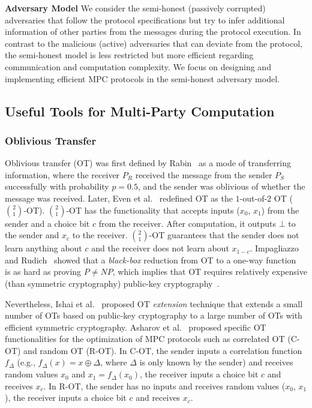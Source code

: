 \textbf{Adversary Model}
We consider the semi-honest (passively corrupted)~\cite[Chapter~2]{evans2017pragmatic} adversaries that follow the protocol specifications but try to infer additional information of other parties from the messages during the protocol execution. In contrast to the malicious (active) adversaries that can deviate from the protocol, the semi-honest model is less restricted but more efficient regarding communication and computation complexity. We focus on designing and implementing efficient MPC protocols in the semi-honest adversary model.

\subsection{Useful Tools for Multi-Party Computation}
\label{subsec:UsefulToolsforMulti-PartyComputation}
\subsubsection{Oblivious Transfer}
\label{subsubsec:OT}
Oblivious transfer (OT) was first defined by Rabin~\cite{rabinOT1981} as a mode of transferring information, where the receiver $P_R$ received the message from the sender $P_S$ successfully with probability $p=0.5$, and the sender was oblivious of whether the message was received.
Later, Even et al.~\cite{even1985} redefined OT as the $1$-out-of-$2$ OT ($\binom{2}{1}$-OT). $\binom{2}{1}$-OT has the functionality that accepts inputs ($x_0$, $x_1$) from the sender and a choice bit $c$ from the receiver. After computation, it outputs $\bot $ to the sender and $x_c$ to the receiver. $\binom{2}{1}$-OT guarantees that the sender does not learn anything about $c$ and the receiver does not learn about $x_{1-c}$.
Impagliazzo and Rudich~\cite{Russel1990} showed that a \textit{black-box} reduction from OT to a one-way function~\cite[Chapter~2]{oded2006foundations} is as hard as proving $P\neq NP$, which implies that OT requires relatively expensive (than symmetric cryptography) public-key cryptography~\cite{rivest1978method}.

Nevertheless, Ishai et al.~\cite{IKNP03} proposed OT \textit{extension} technique that extends a small number of OTs based on public-key cryptography to a large number of OTs with efficient symmetric cryptography.
Asharov et al.~\cite{asharov2017more} proposed specific OT functionalities for the optimization of MPC protocols such as correlated OT (C-OT) and random OT (R-OT). In C-OT, the sender inputs a correlation function $f_{\Delta }$ (e.g., $f_{\Delta }\left(x\right)=x\oplus \Delta $, where $\Delta$ is only known by the sender) and receives random values $x_0$ and $x_1=f_{\Delta }\left(x_0\right)$, the receiver inputs a choice bit $c$ and receives $x_{c}$. In R-OT, the sender has no inputs and receives random values ($x_0$, $x_1$), the receiver inputs a choice bit $c$ and receives $x_c$.

